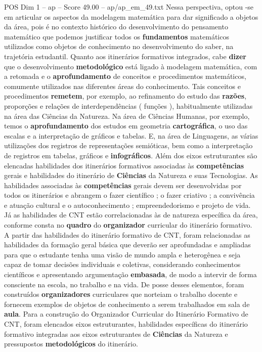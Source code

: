 \begin{textsample}{POS Dim 1 – ap – Score 49.00 – ap/ap\_em\_49.txt}
Nessa perspectiva, optou -se em articular os aspectos da modelagem matemática para dar significado a objetos da área, pois é no contexto histórico do desenvolvimento do pensamento matemático que podemos justificar todos os \textbf{fundamentos} matemáticos utilizados como objetos de conhecimento no desenvolvimento do saber, na trajetória estudantil.
Quanto aos itinerários formativos integrados, cabe \textbf{dizer} que o desenvolvimento \textbf{metodológico} está ligado à modelagem matemática, com a retomada e o \textbf{aprofundamento} de conceitos e procedimentos matemáticos, comumente utilizados nas diferentes áreas do conhecimento.
Tais conceitos e procedimentos \textbf{remetem}, por exemplo, ao refinamento do estudo das \textbf{razões}, proporções e relações de interdependências ( funções ), habitualmente utilizadas na área das Ciências da Natureza.
Na área de Ciências Humanas, por exemplo, temos o \textbf{aprofundamento} dos estudos em geometria \textbf{cartográfica}, o uso das escalas e a interpretação de gráficos e tabelas.
E, na área de Linguagens, as várias utilizações dos registros de representações semióticas, bem como a interpretação de registros em tabelas, gráficos e \textbf{infográficos}.
Além dos eixos estruturantes são elencadas habilidades dos itinerários formativos associadas às \textbf{competências} gerais e habilidades do itinerário de \textbf{Ciências} da Natureza e suas Tecnologias.
As habilidades associadas às \textbf{competências} gerais devem ser desenvolvidas por todos os itinerários e abrangem o fazer científico ; o fazer criativo ; a convivência e atuação cultural e o autoconhecimento ; empreendedorismo e projeto de vida.
Já as habilidades de CNT estão correlacionadas às de natureza específica da área, conforme consta no \textbf{quadro} do \textbf{organizador} curricular do itinerário formativo.
A partir das habilidades do itinerário formativo de CNT, foram relacionadas as habilidades da formação geral básica que deverão ser aprofundadas e ampliadas para que o estudante tenha uma visão de mundo ampla e heterogênea e seja capaz de tomar decisões individuais e coletivas, considerando conhecimentos científicos e apresentando argumentação \textbf{embasada}, de modo a intervir de forma consciente na escola, no trabalho e na vida.
De posse desses elementos, foram construídos \textbf{organizadores} curriculares que norteiam o trabalho docente e fornecem exemplos de objetos de conhecimento a serem trabalhados em sala de \textbf{aula}.
Para a construção do Organizador Curricular do Itinerário Formativo de CNT, foram elencados eixos estruturantes, habilidades específicas do itinerário formativo integradas aos eixos estruturantes de \textbf{Ciências} da Natureza e pressupostos \textbf{metodológicos} do itinerário.

\end{textsample}
